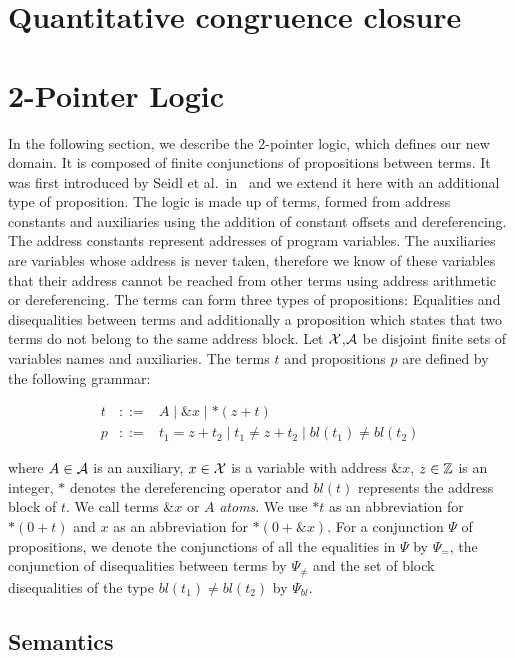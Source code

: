 \section{Quantitative congruence closure}

\section{2-Pointer Logic}

In the following section, we describe the 2-pointer logic, which defines our new domain.
It is composed of finite conjunctions of propositions between terms.
It was first introduced by Seidl et al.\ in~\cite{2pointer} and we extend it here with an additional type of proposition.
The logic is made up of terms, formed from address constants and auxiliaries using the addition of constant offsets and dereferencing.
The address constants represent addresses of program variables.
The auxiliaries are variables whose address is never taken, therefore
we know of these variables that their address cannot be reached from other terms using address arithmetic or dereferencing.
The terms can form three types of propositions: Equalities and disequalities between terms and additionally a proposition which states that two terms do not belong to the same address block.
Let $\mathcal{X}$,$\mathcal{A}$ be disjoint finite sets of variables names and auxiliaries. The terms $t$ and propositions $p$ are defined by the following grammar:

\[
  \begin{array}{lll}
    t & {::=} & A \mid \&x \mid *(z+t)                                \\
    p & {::=} & t_1=z+t_2 \mid t_1\neq z+t_2\mid bl(t_1) \neq bl(t_2)
  \end{array}
\]

where $A\in \mathcal{A}$ is an auxiliary, $x \in \mathcal{X}$ is a variable with address $\&x$, $z \in \mathbb{Z}$ is an integer, $*$ denotes the dereferencing operator and $bl(t)$ represents the address block of $t$. We call terms $\&x$ or $A$ \emph{atoms}. We use $*t$ as an abbreviation for $*(0+t)$ and $x$ as an abbreviation for $*(0+\&x)$.
For a conjunction $\Psi$ of propositions, we denote the conjunctions of all the equalities in $\Psi$ by $\Psi_{=}$, the conjunction of disequalities between terms by $\Psi_{\neq}$ and the set of block disequalities of the type $bl(t_1) \neq bl(t_2)$ by $\Psi_{bl}$.

\subsection{Semantics}


